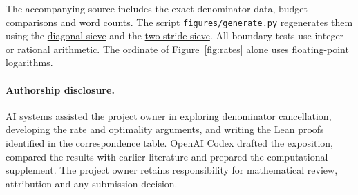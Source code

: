 \documentclass[11pt]{article}
\newcommand{\cp}{https://github.com/eldernos/MathematicsResearch/blob/a09e011720bc74396a27f4cb3ce2d8a5b3ce5035}
\begin{document}
The accompanying source includes the exact denominator data, budget comparisons and word counts. The script \texttt{figures/generate.py} regenerates them using the \href{\cp/scripts/strided_logarithm.py}{diagonal sieve} and the \href{\cp/scripts/corrected_strides.py}{two-stride sieve}. All boundary
tests use integer or rational arithmetic. The ordinate of
Figure~\ref{fig:rates} alone uses floating-point logarithms.

\paragraph{Authorship disclosure.}
AI systems assisted the project owner in exploring denominator cancellation, developing the rate and optimality arguments, and writing the Lean proofs identified in the correspondence table. OpenAI Codex drafted the exposition, compared the results with earlier literature and prepared the computational supplement.
The project owner retains responsibility for mathematical review,
attribution and any submission decision.

\begingroup\small


\endgroup
\end{document}
